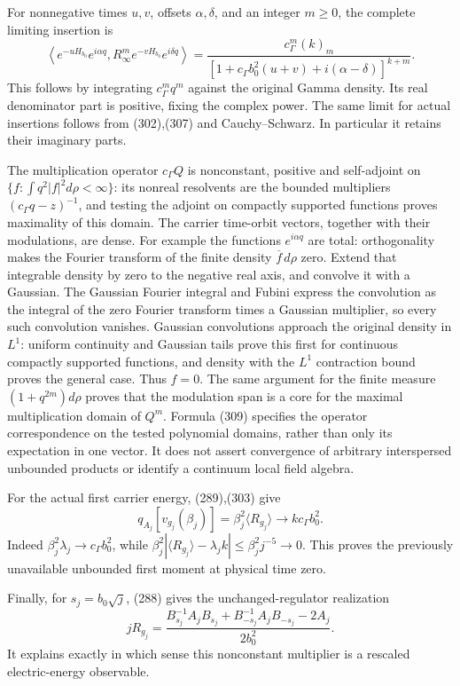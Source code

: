 \documentclass[
  11pt,
]{article}
\begin{document}
For nonnegative times \(u,v\), offsets \(\alpha,\delta\), and an integer
\(m\ge0\), the complete limiting insertion is \[
 \boxed{
 \left\langle e^{-uH_{b_0}}e^{i\alpha q},
            R_\infty^m e^{-vH_{b_0}}e^{i\delta q}\right\rangle
 =\frac{c_\Gamma^m(k)_m}
 {[1+c_\Gamma b_0^2(u+v)+i(\alpha-\delta)]^{k+m}} .
 }
 \tag{309}
\] This follows by integrating \(c_\Gamma^mq^m\) against the original
Gamma density. Its real denominator part is positive, fixing the complex
power. The same limit for actual insertions follows from (302),(307) and
Cauchy--Schwarz. In particular it retains their imaginary parts.

The multiplication operator \(c_\Gamma Q\) is nonconstant, positive and
self-adjoint on \(\{f:\int q^2|f|^2d\rho<\infty\}\): its nonreal
resolvents are the bounded multipliers \((c_\Gamma q-z)^{-1}\), and
testing the adjoint on compactly supported functions proves maximality
of this domain. The carrier time-orbit vectors, together with their
modulations, are dense. For example the functions \(e^{i\alpha q}\) are
total: orthogonality makes the Fourier transform of the finite density
\(\overline f\,d\rho\) zero. Extend that integrable density by zero to
the negative real axis, and convolve it with a Gaussian. The Gaussian
Fourier integral and Fubini express the convolution as the integral of
the zero Fourier transform times a Gaussian multiplier, so every such
convolution vanishes. Gaussian convolutions approach the original
density in \(L^1\): uniform continuity and Gaussian tails prove this
first for continuous compactly supported functions, and density with the
\(L^1\) contraction bound proves the general case. Thus \(f=0\). The
same argument for the finite measure \((1+q^{2m})d\rho\) proves that the
modulation span is a core for the maximal multiplication domain of
\(Q^m\). Formula (309) specifies the operator correspondence on the
tested polynomial domains, rather than only its expectation in one
vector. It does not assert convergence of arbitrary interspersed
unbounded products or identify a continuum local field algebra.

For the actual first carrier energy, (289),(303) give \[
 q_{A_j}[v_{g_j}(\beta_j)]
 =\beta_j^2\langle R_{g_j}\rangle
 \longrightarrow k c_\Gamma b_0^2.
 \tag{310}
\] Indeed \(\beta_j^2\lambda_j\to c_\Gamma b_0^2\), while
\(\beta_j^2|\langle R_{g_j}\rangle-\lambda_j k|
\le\beta_j^2j^{-5}\to0\). This proves the previously unavailable
unbounded first moment at physical time zero.

Finally, for \(s_j=b_0\sqrt j\), (288) gives the unchanged-regulator
realization \[
 jR_{g_j}
 =\frac{B_{s_j}^{-1}A_jB_{s_j}
        +B_{-s_j}^{-1}A_jB_{-s_j}-2A_j}{2b_0^2}.
 \tag{311}
\] It explains exactly in which sense this nonconstant multiplier is a
rescaled electric-energy observable.
\end{document}
